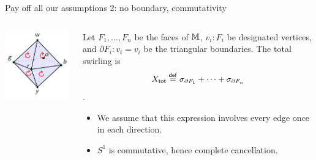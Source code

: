 \begin{frame}{Pay off all our assumptions 2: no boundary, commutativity}
\begin{columns}
\begin{column}{0.15\textwidth}
\includegraphics{figs/oo_orientation.pdf}
\end{column}
\begin{column}{0.85\textwidth}
\begin{mydef}
Let \( F_1,\ldots,F_n \) be the faces of \( \mathbb{M} \), \( v_i:F_i \) be designated vertices, and \( \partial F_i:v_i=v_i \) be the triangular boundaries. The \alert{total swirling} is \[ X_{\mathsf{tot}} \stackrel{\mathsf{def}}{=} \sigma_{\partial F_1}+\cdots+\sigma_{\partial F_n} \].
\end{mydef}
\begin{itemize}
\item<2-> We assume that this expression involves \alert{every edge once in each direction}.
\item<3-> \( S^1 \) is commutative, hence \alert{complete cancellation}.
\end{itemize}
\end{column}
\end{columns}
\end{frame}

